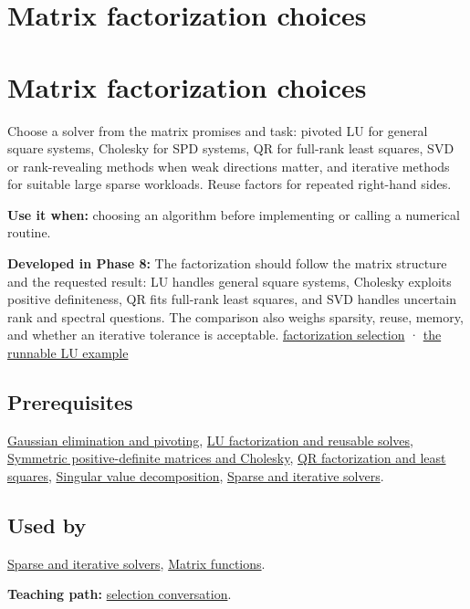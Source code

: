 \hypertarget{appendix-221a483bec2d}{}
\section*{Matrix factorization choices}
\section{Matrix factorization choices}\label{matrix-factorization-choices}

Choose a solver from the matrix promises and task: pivoted LU for general square systems, Cholesky for SPD systems, QR for full-rank least squares, SVD or rank-revealing methods when weak directions matter, and iterative methods for suitable large sparse workloads. Reuse factors for repeated right-hand sides.

\textbf{Use it when:} choosing an algorithm before implementing or calling a numerical routine.

\textbf{Developed in Phase 8:} The factorization should follow the matrix structure and the requested result: LU handles general square systems, Cholesky exploits positive definiteness, QR fits full-rank least squares, and SVD handles uncertain rank and spectral questions. The comparison also weighs sparsity, reuse, memory, and whether an iterative tolerance is acceptable. \href{Continuous\%20Notes/Computing\%20Foundations\%20-\%20From\%20Bits\%20to\%20C++\%20and\%20Systems\%20APIs\#Choose\%20a\%20factorization\%20from\%20structure\%20and\%20the\%20requested\%20answer}{factorization selection} · \href{Continuous\%20Notes/Computing\%20Foundations\%20-\%20From\%20Bits\%20to\%20C++\%20and\%20Systems\%20APIs\#A\%20runnable\%20pivoted\%20LU\%20reference\%20preserves\%20the\%20elimination\%20history}{the runnable LU example}

\subsection{Prerequisites}\label{prerequisites}

\hyperref[appendix-f6e77f4a200f]{Gaussian elimination and pivoting}, \hyperref[appendix-55e4b5b0a1e6]{LU factorization and reusable solves}, \hyperref[appendix-50d2ea3c9b26]{Symmetric positive-definite matrices and Cholesky}, \hyperref[appendix-c3421e6b4f2c]{QR factorization and least squares}, \hyperref[appendix-1fad5e7f36fa]{Singular value decomposition}, \hyperref[appendix-67c87a3d9e94]{Sparse and iterative solvers}.

\subsection{Used by}\label{used-by}

\hyperref[appendix-67c87a3d9e94]{Sparse and iterative solvers}, \hyperref[appendix-0f4bc2bf2b1f]{Matrix functions}.

\textbf{Teaching path:} \href{Continuous\%20Notes/Computing\%20Foundations\%20-\%20From\%20Bits\%20to\%20C++\%20and\%20Systems\%20APIs\#Close\%20the\%20journey\%20with\%20an\%20algorithm-selection\%20conversation}{selection conversation}.
